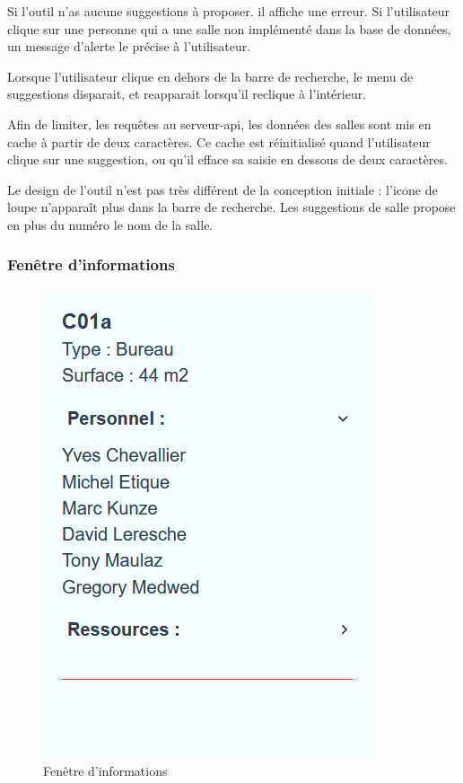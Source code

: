 \documentclass[
    iai, %
    il, %
]{heig-tb}
\begin{document}
Si l'outil n'as aucune suggestions à proposer. il affiche une erreur.
Si l'utilisateur clique sur une personne qui a une salle non implémenté dans la base de données,
un message d'alerte le précise à l'utilisateur.

Lorsque l'utilisateur clique en dehors de la barre de recherche, le menu de suggestions disparait,
et reapparait lorsqu'il reclique à l'intérieur.

Afin de limiter, les requêtes au serveur-api, les données des salles sont mis en cache à partir de deux caractères.
Ce cache est réinitialisé quand l'utilisateur clique sur une suggestion, ou qu'il efface sa saisie en dessous de deux caractères.

Le design de l'outil n'est pas très différent de la conception initiale : l'icone de loupe n'apparaît plus dans  la barre de recherche.
Les suggestions de salle propose en plus du numéro le nom de la salle.

\subsubsection{Fenêtre d'informations}

\begin{figure}[h]
    \centering
    \includegraphics[scale=0.5]{frontend-info.png}
    \caption{Fenêtre d'informations}
    \label{fig:info}
\end{figure}
\end{document}
